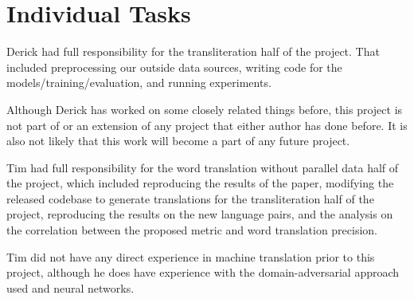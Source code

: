 \documentclass{article}
\begin{document}
\section*{Individual Tasks}

Derick had full responsibility for the transliteration half of the project.
That included preprocessing our outside data sources,
writing code for the models/training/evaluation,
and running experiments.

Although Derick has worked on some closely related things before,
this project is not part of or an extension of any project
that either author has done before.
It is also not likely that this work will become a part of any future project.

Tim had full responsibility for the word translation without parallel data
half of the project, which included reproducing the results of the paper,
modifying the released codebase to generate translations for the
transliteration half of the project, reproducing the results on the new
language pairs, and the analysis on the correlation between the proposed
metric and word translation precision.

Tim did not have any direct experience in machine translation prior to this
project, although he does have experience with the domain-adversarial
approach used and neural networks.

{}

\end{document}
